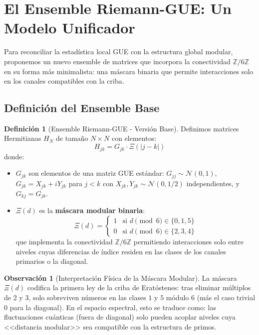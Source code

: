 \documentclass[12pt, a4paper]{article}
\theoremstyle{plain}
\theoremstyle{definition}
\newtheorem{definicion}[teorema]{Definición}
\newtheorem{observacion}[teorema]{Observación}
\theoremstyle{remark}
\newcommand{\Z}{\mathbb{Z}}
\begin{document}
\section{El Ensemble Riemann-GUE: Un Modelo Unificador}
\label{sec:ensemble_riemann}

Para reconciliar la estadística local GUE con la estructura global modular, proponemos un nuevo ensemble de matrices que incorpora la conectividad $\Z/6\Z$ en su forma más minimalista: una máscara binaria que permite interacciones solo en los canales compatibles con la criba.

\subsection{Definición del Ensemble Base}
\label{subsec:definicion_ensemble}

\begin{definicion}[Ensemble Riemann-GUE - Versión Base]
\label{def:ensemble_base}
Definimos matrices Hermitianas $H_N$ de tamaño $N \times N$ con elementos:
\[
H_{jk} = G_{jk} \cdot \Xi(|j-k|)
\]
donde:
\begin{itemize}
\item $G_{jk}$ son elementos de una matriz GUE estándar: $G_{jj} \sim \mathcal{N}(0,1)$, $G_{jk} = X_{jk} + i Y_{jk}$ para $j < k$ con $X_{jk}, Y_{jk} \sim \mathcal{N}(0,1/2)$ independientes, y $G_{kj} = \overline{G_{jk}}$.

\item $\Xi(d)$ es la \textbf{máscara modular binaria}:
\[
\Xi(d) = 
\begin{cases}
1 & \text{si } d \pmod{6} \in \{0, 1, 5\} \\
0 & \text{si } d \pmod{6} \in \{2, 3, 4\}
\end{cases}
\]
que implementa la conectividad $\Z/6\Z$ permitiendo interacciones solo entre niveles cuyas diferencias de índice residen en las clases de los canales primarios o la diagonal.
\end{itemize}
\end{definicion}

\begin{observacion}[Interpretación Física de la Máscara Modular]
La máscara $\Xi(d)$ codifica la primera ley de la criba de Eratóstenes: tras eliminar múltiplos de 2 y 3, solo sobreviven números en las clases $1$ y $5$ módulo 6 (más el caso trivial 0 para la diagonal). En el espacio espectral, esto se traduce como: las fluctuaciones cuánticas (fuera de diagonal) solo pueden acoplar niveles cuya <<distancia modular>> sea compatible con la estructura de primos.
\end{observacion}
\end{document}
